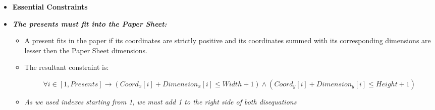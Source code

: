 \begin{itemize}
    \item[] \textbf{Essential Constraints}
    \item \textbf{\textit{The presents must fit into the Paper Sheet:}}
        \begin{itemize}
            \item[] A present fits in the paper if its coordinates are strictly positive
                and its coordinates summed with its corresponding dimensions are lesser then
                the Paper Sheet dimensions.
            \item[] The resultant constraint is:
            \begin{adjustwidth}{-3cm}{}\begin{equation*}
                \forall i \in [1, Presents] \rightarrow
                (Coord_x[i] + Dimension_x[i] \leq Width + 1) \wedge
                (Coord_y[i] + Dimension_y[i] \leq Height + 1)
            \end{equation*}\end{adjustwidth} 
            \item[] \textit{As we used indexes starting from 1, we must add 1 to the right side of both disequations} 
        \end{itemize}


\end{itemize}
